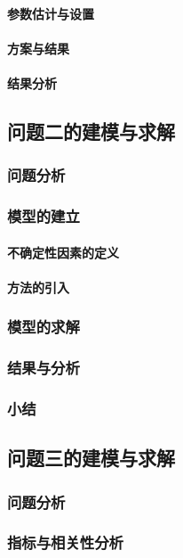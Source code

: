 \documentclass[withoutpreface]{cumcmthesis}
\begin{document}
\paragraph{参数估计与设置}
\paragraph{方案与结果}
\paragraph{结果分析}

\subsection{问题二的建模与求解}
\subsubsection{问题分析}
\subsubsection{模型的建立}
\paragraph{不确定性因素的定义}
\paragraph{方法的引入}
\subsubsection{模型的求解}
\subsubsection{结果与分析}
\subsubsection{小结}

\subsection{问题三的建模与求解}
\subsubsection{问题分析}
\subsubsection{指标与相关性分析}
\end{document}
